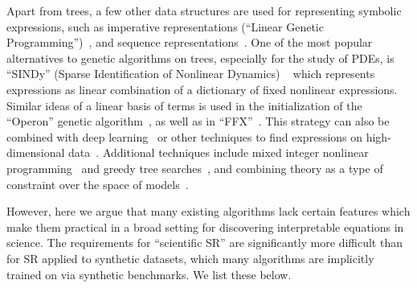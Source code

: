 \documentclass[letterpaper,twocolumn]{scrartcl}
\begin{document}
\begin{linenumbers}
Apart from trees, a few other data structures are used for representing symbolic expressions, such as imperative representations (``Linear Genetic Programming'')~\citep[e.g.,][]{brameierComparisonLinearGenetic2001,guvenLinearGeneticProgramming2009,maEvolvingSymbolicDensity2022,diasDescribingQuantumInspiredLinear2012}, and sequence representations~\citep[e.g.,][]{liuAIPoincareMachine2020,dascoliDeepSymbolicRegression2022,kamiennyEndtoendSymbolicRegression2022}.
One of the most popular alternatives to genetic algorithms on trees, especially for the study of PDEs, is ``SINDy'' (Sparse Identification of Nonlinear Dynamics) ~\cite{bruntonDiscoveringGoverningEquations2016,rudyDatadrivenDiscoveryPartial2017,championDatadrivenDiscoveryCoordinates2019} which represents expressions as linear combination of a dictionary of fixed nonlinear expressions.
Similar ideas of a linear basis of terms is used in the initialization of the ``Operon'' genetic algorithm~\cite{burlacuOperonEfficientGenetic2020}, as well as in ``FFX''~\cite{mcconaghyFFXFastScalable2011}.
This strategy can also be combined with deep learning~\citep[e.g., ][]{luschDeepLearningUniversal2018,championDatadrivenDiscoveryCoordinates2019,bothDeepMoDDeepLearning2019,chenDeepLearningPhysical2020,rackauckasUniversalDifferentialEquations2020} or other techniques to find expressions on high-dimensional data~\citep[e.g., ][]{rossBenchmarkingMachineLearning2022}.
Additional techniques include mixed integer nonlinear programming~\citep{cozadGlobalMINLPApproach2018} and greedy tree searches~\citep{defrancaGreedySearchTree2018}, and combining theory as a type of constraint over the space of models~\cite{cornelioAIDescartesCombining2021}.


However, here we argue that many existing algorithms lack certain features which make them practical in a broad setting for discovering interpretable equations in science.
The requirements for ``scientific SR'' are significantly more difficult than for SR applied to synthetic datasets, which many algorithms are implicitly trained on via synthetic benchmarks.
We list these below.


\end{linenumbers}
\end{document}
